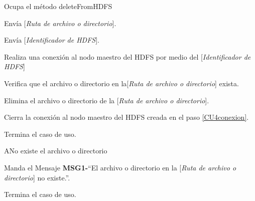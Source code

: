 
\begin{UCtrayectoria}

\UCpaso[\UCactor] Ocupa el método deleteFromHDFS

\UCpaso[\UCactor] Envía [{\em Ruta de archivo o directorio}].

\UCpaso[\UCactor] Envía [{\em Identificador de HDFS}].

\UCpaso[\UCsist] Realiza una conexión al nodo maestro del HDFS por medio del [{\em Identificador de HDFS}]\label{CU4conexion}

\UCpaso[\UCsist] Verifica que el archivo o directorio en la[{\em Ruta de archivo o directorio}] exista. 

\UCpaso[\UCsist] Elimina el archivo o directorio de la [{\em Ruta de archivo o directorio}].

\UCpaso[\UCsist] Cierra la conexión al nodo maestro del HDFS creada en el paso \ref{CU4conexion}.

\UCpaso[] Termina el caso de uso.

\end{UCtrayectoria}




\begin{UCtrayectoriaA}{A}{No existe el archivo o directorio}

	\UCpaso Manda el Mensaje {\bf MSG1-}``El archivo o directorio en la [{\em Ruta de archivo o directorio}] no existe.''.

	\UCpaso[] Termina el caso de uso.

\end{UCtrayectoriaA}





